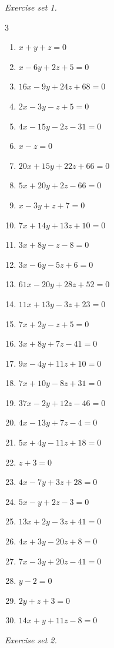 \par\noindent\emph{Exercise set 1.}\nopagebreak
\begin{multicols}{3}\raggedright
\begin{enumerate}[label=\arabic*., leftmargin=*, itemsep=1pt]
\item $x+y+z=0$
\item $x-6y+2z+5=0$
\item $16x-9y+24z+68=0$
\item $2x-3y-z+5=0$
\item $4x-15y-2z-31=0$
\item $x-z=0$
\item $20x+15y+22z+66=0$
\item $5x+20y+2z-66=0$
\item $x-3y+z+7=0$
\item $7x+14y+13z+10=0$
\item $3x+8y-z-8=0$
\item $3x-6y-5z+6=0$
\item $61x-20y+28z+52=0$
\item $11x+13y-3z+23=0$
\item $7x+2y-z+5=0$
\item $3x+8y+7z-41=0$
\item $9x-4y+11z+10=0$
\item $7x+10y-8z+31=0$
\item $37x-2y+12z-46=0$
\item $4x-13y+7z-4=0$
\item $5x+4y-11z+18=0$
\item $z+3=0$
\item $4x-7y+3z+28=0$
\item $5x-y+2z-3=0$
\item $13x+2y-3z+41=0$
\item $4x+3y-20z+8=0$
\item $7x-3y+20z-41=0$
\item $y-2=0$
\item $2y+z+3=0$
\item $14x+y+11z-8=0$
\end{enumerate}
\end{multicols}
\par\noindent\emph{Exercise set 2.}\nopagebreak
